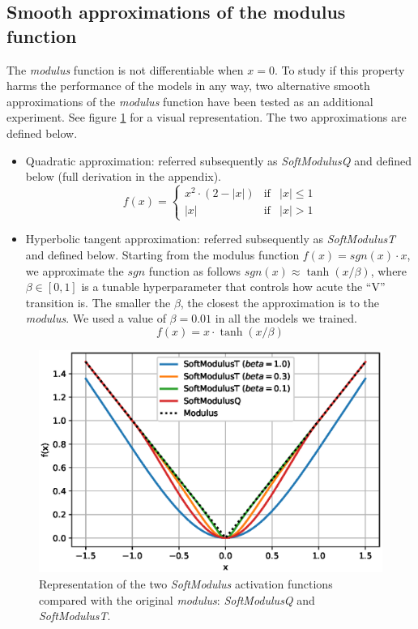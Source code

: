 \subsection{Smooth approximations of the modulus function}
The \textit{modulus} function is not differentiable when $x=0$. To study if this property harms the performance of the models in any way, two alternative smooth approximations of the \textit{modulus} function have been tested as an additional experiment. See figure \ref{fig:activationssmooth} for a visual representation. The two approximations are defined below.
\begin{itemize}
	\item Quadratic approximation: referred subsequently as \textit{SoftModulusQ} and defined below (full derivation in the appendix).
	$$
	f(x)= \left\{ \begin{array}{lcc}
	x^2 \cdot (2-|x|) &  \text{if} & |x| \leq 1 \\
	|x| &   \text{if}  & |x| > 1
	\end{array}
	\right.
	$$
	\item Hyperbolic tangent approximation: referred subsequently as \textit{SoftModulusT} and defined below. Starting from the modulus function $f(x)=sgn(x)\cdot x$, we approximate the $sgn$ function as follows $sgn(x) \approx \tanh(x/\beta)$, where $\beta \in [0, 1]$ is a tunable hyperparameter that controls how acute the ``V'' transition is. The smaller the $\beta$, the closest the approximation is to the \textit{modulus}. We used a value of $\beta=0.01$ in all the models we trained.
	$$f(x) = x \cdot \tanh(x/\beta)$$
\end{itemize}

\begin{figure}[h!]
	\centering
	\includegraphics[width=0.5\linewidth]{modulus/images/activations_smooth}
	\caption{Representation of the two \textit{SoftModulus} activation functions compared with the original \textit{modulus}: \textit{SoftModulusQ} and \textit{SoftModulusT}.}
	\label{fig:activationssmooth}
\end{figure}

